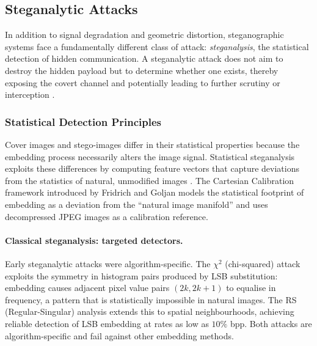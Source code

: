 \documentclass[12pt,a4paper,oneside]{report}
\begin{document}
	\subsection{Steganalytic Attacks}
	\label{subsec:attack_steganalysis}
	
	In addition to signal degradation and geometric distortion, steganographic systems face a
	fundamentally different class of attack: \emph{steganalysis}, the statistical detection of
	hidden communication. A steganalytic attack does not aim to destroy the hidden payload but to
	determine whether one exists, thereby exposing the covert channel and potentially leading to
	further scrutiny or interception \cite{Fridrich2012}.
	
	\subsubsection{Statistical Detection Principles}
	
	Cover images and stego-images differ in their statistical properties because the embedding
	process necessarily alters the image signal. Statistical steganalysis exploits these differences
	by computing feature vectors that capture deviations from the statistics of natural, unmodified
	images \cite{Fridrich2012}. The Cartesian Calibration framework introduced by Fridrich and
	Goljan \cite{fridrich2004attacks} models the statistical footprint of embedding as a deviation
	from the ``natural image manifold'' and uses decompressed JPEG images as a calibration reference.
	
	\paragraph{Classical steganalysis: targeted detectors.}
	Early steganalytic attacks were algorithm-specific. The $\chi^2$ (chi-squared) attack
	\cite{westfeld2001f5} exploits the symmetry in histogram pairs produced by LSB substitution:
	embedding causes adjacent pixel value pairs $(2k, 2k+1)$ to equalise in frequency, a pattern
	that is statistically impossible in natural images. The RS (Regular-Singular) analysis
	\cite{provos2003hide} extends this to spatial neighbourhoods, achieving reliable detection
	of LSB embedding at rates as low as $10\%$ bpp. Both attacks are algorithm-specific and fail
	against other embedding methods.
	
\end{document}

